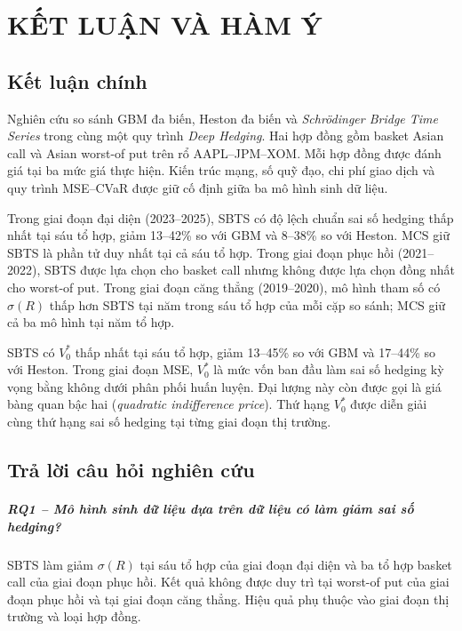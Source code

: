 
\chapter{KẾT LUẬN VÀ HÀM Ý}
\label{chap:ket-luan}

\section{Kết luận chính}
\label{sec:c5-main-conclusion}

Nghiên cứu so sánh GBM đa biến, Heston đa biến và
\textit{Schrödinger Bridge Time Series} trong cùng một quy trình
\textit{Deep Hedging}. Hai hợp đồng gồm basket Asian call và Asian worst-of
put trên rổ AAPL--JPM--XOM. Mỗi hợp đồng được đánh giá tại ba mức giá thực
hiện. Kiến trúc mạng, số quỹ đạo, chi phí giao dịch và quy trình MSE--CVaR được
giữ cố định giữa ba mô hình sinh dữ liệu.

Trong giai đoạn đại diện (2023--2025), SBTS có độ lệch chuẩn sai số hedging thấp nhất tại
sáu tổ hợp, giảm 13--42\% so với GBM và 8--38\% so với Heston. MCS giữ SBTS là
phần tử duy nhất tại cả sáu tổ hợp. Trong giai đoạn phục hồi (2021--2022), SBTS được lựa
chọn cho basket call nhưng không được lựa chọn đồng nhất cho worst-of put.
Trong giai đoạn căng thẳng (2019--2020), mô hình tham số có $\sigma(R)$ thấp hơn SBTS tại năm
trong sáu tổ hợp của mỗi cặp so sánh; MCS giữ cả ba mô hình tại năm tổ hợp.

SBTS có $V_0^{*}$ thấp nhất tại sáu tổ hợp, giảm 13--45\% so với GBM và
17--44\% so với Heston. Trong giai đoạn MSE, $V_0^{*}$ là mức vốn ban đầu làm
sai số hedging kỳ vọng bằng không dưới phân phối huấn luyện. Đại lượng này
còn được gọi là giá bàng quan bậc hai (\textit{quadratic indifference price}).
Thứ hạng $V_0^{*}$ được diễn giải cùng thứ hạng sai số hedging tại từng giai
đoạn thị trường.

\section{Trả lời câu hỏi nghiên cứu}
\label{sec:c5-rq}

\paragraph{RQ1 -- Mô hình sinh dữ liệu dựa trên dữ liệu có làm giảm sai số hedging?}
SBTS làm giảm $\sigma(R)$ tại sáu tổ hợp của giai đoạn đại diện và ba tổ hợp basket call
của giai đoạn phục hồi. Kết quả không được duy trì tại worst-of put của giai
đoạn phục hồi và tại giai đoạn căng thẳng. Hiệu
quả phụ thuộc vào giai đoạn thị trường và loại hợp đồng.

